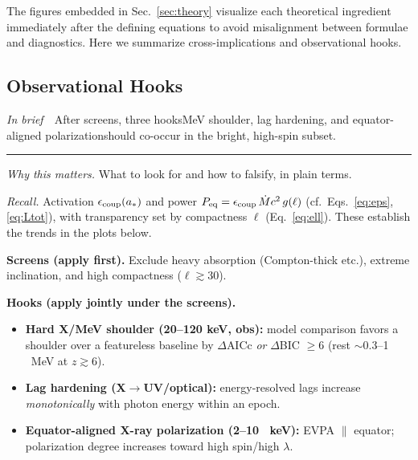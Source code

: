 \documentclass[twocolumn]{aastex701}
\newcommand{\ellcrit}{30}
\newenvironment{titemize}{%
  \begin{itemize}\setlength{\itemsep}{0pt}\setlength{\parsep}{0pt}\setlength{\parskip}{0pt}%
}{\end{itemize}}
\providecommand{\tldr}[1]{%
  \noindent\textit{In brief}\ \textemdash\ #1%
  \par\smallskip
  \noindent\rule{\columnwidth}{0.2pt}\par\medskip
}
\begin{document}
The figures embedded in Sec.~\ref{sec:theory} visualize each theoretical ingredient immediately after the defining equations to avoid misalignment between formulae and diagnostics. Here we summarize cross-implications and observational hooks.

\clearpage
\subsection{Observational Hooks}\label{sec:obs}
\tldr{After screens, three hooks\textemdash{}MeV shoulder, lag hardening, and equator-aligned polarization\textemdash{}should co-occur in the bright, high-spin subset.}
\suppressfloats[t]  %

\noindent\textit{Why this matters.} What to look for and how to falsify, in plain terms.

\noindent\textit{Recall.}
Activation $\epsilon_{\rm coup}(a_\ast)$ and power $P_{\rm eq}=\epsilon_{\rm coup}\,\dot{M}c^2\,g(\ell)$
(cf.\ Eqs.~\eqref{eq:eps}, \eqref{eq:Ltot}), with transparency set by compactness $\ell$ (Eq.~\eqref{eq:ell}).
These establish the trends in the plots below.

\noindent\textbf{Screens (apply first).}
Exclude heavy absorption (Compton-thick etc.), extreme inclination, and high compactness ($\ell\gtrsim\ellcrit$).

\noindent\textbf{Hooks (apply jointly under the screens).}
\begin{titemize}
  \item \textbf{Hard X/MeV shoulder (20--120 keV, obs):}
        model comparison favors a shoulder over a featureless baseline by
        $\Delta$AICc \emph{or} $\Delta$BIC $\ge 6$
        (rest $\sim$0.3--1 ~MeV at $z\gtrsim6$).
  \item \textbf{Lag hardening (X$\to$UV/optical):}
        energy-resolved lags increase \emph{monotonically} with photon energy within an epoch.
  \item \textbf{Equator-aligned X-ray polarization (2--10 ~keV):}
        EVPA $\parallel$ equator; polarization degree increases toward high spin/high $\lambda$.
\end{titemize}
\end{document}
